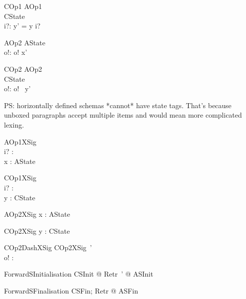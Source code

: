 \begin{schema}{COp1}
\zfsrefines AOp1\\
   \Delta CState \\
   i?: \nat
\where
   y' = y \cat \langle i? \rangle
\end{schema}

\begin{schema}{AOp2}
   \Xi AState \\
   o!: \nat
\where
    o! \in  x'
\end{schema}

\begin{schema}{COp2}
\zfsrefines AOp2\\
   \Xi CState \\
   o!: \nat
\where
   o! \in \ran~y'
\end{schema}

PS: horizontally defined schemas *cannot* have state tags. That's because
unboxed paragraphs accept multiple items and would mean more complicated lexing.

\begin{schema}{AOp1XSig}\\
 i? : \nat \\
 x : \power \nat
\where
 AState
\end{schema}

\begin{schema}{COp1XSig}\\
 i? : \nat \\
 y : \seq \nat
\where
 CState
\end{schema}

\begin{schema}{AOp2XSig}
 x : \power \nat
\where
 AState
\end{schema}

\begin{schema}{COp2XSig}
 y : \seq \nat
\where
 CState
\end{schema}

\begin{schema}{COp2DashXSig}
   COp2XSig~' \\
   o! : \nat
\end{schema}

\begin{theorem}{ForwardSInitialisation}
   \forall CSInit @ \exists Retr~' @ ASInit
\end{theorem}

\begin{theorem}{ForwardSFinalisation}
   \forall CSFin; Retr @ ASFin
\end{theorem}

